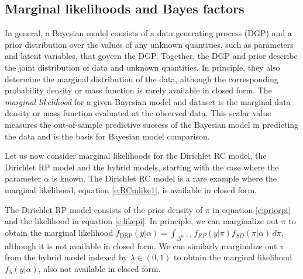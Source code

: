 \documentclass[11pt,letter]{article}
\newcommand{\Dpi}{Dirichlet RP model}
\newcommand{\DP}{Dirichlet RC model}
\begin{document}
\subsection{Marginal likelihoods and Bayes factors}

In general, a Bayesian model consists of a data generating process (DGP) and a prior distribution over the values of any unknown quantities, such as parameters and latent variables, that govern the DGP.
Together, the DGP and prior describe the joint distribution of data and unknown quantities.
In principle, they also determine the marginal distribution of the data, although the corresponding probability density or mass function is rarely available in closed form.
The {\em marginal likelihood} for a given Bayesian model and dataset is the marginal data density or mass function evaluated at the observed data.
This scalar value measures the out-of-sample predictive success of the Bayesian model in predicting the data and is the basis for Bayesian model comparison.

Let us now consider marginal likelihoods for the \DP{}, the \Dpi{} and the hybrid models, starting with the case where the parameter $\alpha$ is known.
The \DP{} is a rare example where the marginal likelihood, equation \eqref{e:RCmlike1}, is available in closed form.

The \Dpi{} consists of the prior density of $\pi$ in equation \eqref{e:priorpi} and the likelihood in equation \eqref{e:likepi}.
In principle, we can marginalize out $\pi$ to obtain the marginal likelihood $f_\mathrm{DRP}(y|\alpha) = \int_{\Delta^{n!-1}} f_{RP}(y|\pi) f_{SD}(\pi|\alpha)\,d\pi $, although it is not available in closed form.
We can similarly marginalize out $\pi$ from the hybrid model indexed by $\lambda \in (0,1)$ to obtain the marginal likelihood $f_\lambda(y|\alpha)$, also not available in closed form.

\end{document}
